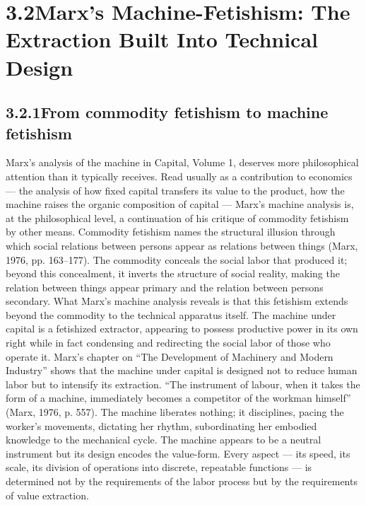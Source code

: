 \section{3.2\quad Marx’s Machine-Fetishism: The Extraction Built Into Technical Design}

\subsection{3.2.1\quad From commodity fetishism to machine fetishism}

Marx’s analysis of the machine in Capital, Volume 1, deserves more philosophical attention than it typically receives. Read usually as a contribution to economics — the analysis of how fixed capital transfers its value to the product, how the machine raises the organic composition of capital — Marx’s machine analysis is, at the philosophical level, a continuation of his critique of commodity fetishism by other means. Commodity fetishism names the structural illusion through which social relations between persons appear as relations between things (Marx, 1976, pp. 163–177). The commodity conceals the social labor that produced it; beyond this concealment, it inverts the structure of social reality, making the relation between things appear primary and the relation between persons secondary. What Marx’s machine analysis reveals is that this fetishism extends beyond the commodity to the technical apparatus itself. The machine under capital is a fetishized extractor, appearing to possess productive power in its own right while in fact condensing and redirecting the social labor of those who operate it. Marx’s chapter on “The Development of Machinery and Modern Industry” shows that the machine under capital is designed not to reduce human labor but to intensify its extraction. “The instrument of labour, when it takes the form of a machine, immediately becomes a competitor of the workman himself” (Marx, 1976, p. 557). The machine liberates nothing; it disciplines, pacing the worker’s movements, dictating her rhythm, subordinating her embodied knowledge to the mechanical cycle. The machine appears to be a neutral instrument but its design encodes the value-form. Every aspect — its speed, its scale, its division of operations into discrete, repeatable functions — is determined not by the requirements of the labor process but by the requirements of value extraction.

